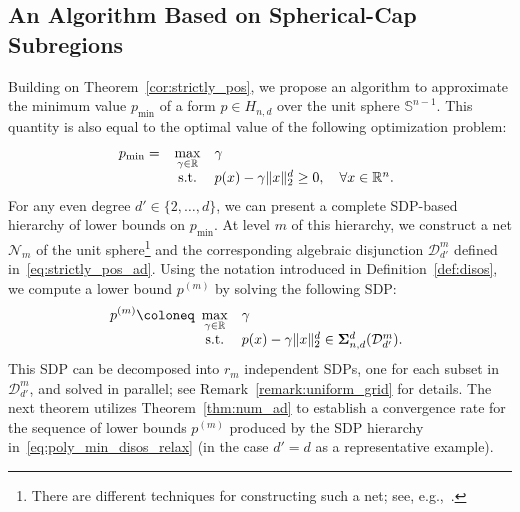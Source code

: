 \documentclass[12pt]{article}
\newcommand{\reals}{\mathbb{R}}
\newcommand{\DiSOS}{\mathbf{\Sigma}}
\newcommand{\defeq}{\coloneq}
\newcommand{\st}{\text{s.t.}}
\newcommand{\mcN}{\mathcal{N}}
\newcommand{\mbS}{\mathbb{S}}
\newcommand{\mcD}{\mathcal{D}}
\theoremstyle{remark}
\begin{document}
\subsection{An Algorithm Based on Spherical-Cap Subregions} \label{sec:disos_grid}
Building on Theorem~\ref{cor:strictly_pos}, we propose an algorithm to approximate the minimum value $p_{\min}$ of a form $p\in H_{n,d}$ over the unit sphere $\mbS^{n-1}$. This quantity is also equal to the optimal value of the following optimization problem:
\begin{equation}\label{eq:poly_min}
	p_{\min} =\; \begin{array}[t]{cl}
		\max\limits_{\gamma\in{\scriptsize\reals}} & \gamma\\
		\st & p(x)-\gamma\|x\|_2^d\ge 0,\quad\forall x\in\reals^n.
	\end{array}
\end{equation}
For any even degree $d'\in\{2,\ldots,d\}$, we can present a complete SDP-based hierarchy of lower bounds on $p_{\min}$. At level $m$ of this hierarchy, we construct a net $\mcN_m$ of the unit sphere\footnote{There are different techniques for constructing such a net; see, e.g.,~\cite{leopardi_partition_2006,chakraborty2022generating}.} and the corresponding algebraic disjunction $\mcD_{d'}^m$ defined in~\eqref{eq:strictly_pos_ad}. Using the notation introduced in Definition~\ref{def:disos}, we compute a lower bound $p^{(m)}$ by solving the following SDP:
\begin{equation}\label{eq:poly_min_disos_relax}
	p^{(m)} \defeq \begin{array}[t]{cl}
		\max\limits_{\gamma\in{\scriptsize\reals}} & \gamma\\
		\st & p(x)-\gamma\|x\|_2^d\in\DiSOS_{n,d}^{d}(\mcD_{d'}^m).
	\end{array}
\end{equation}
{This SDP can be decomposed into $r_m$ independent SDPs, one for each subset in $\mcD_{d'}^m$, and solved in parallel; see Remark~\ref{remark:uniform_grid} for details.} 
The next theorem utilizes Theorem~\ref{thm:num_ad} to establish a convergence rate for the sequence of lower bounds $p^{(m)}$ produced by the SDP hierarchy in~\eqref{eq:poly_min_disos_relax} (in the case $d'=d$ as a representative example).

\end{document}

